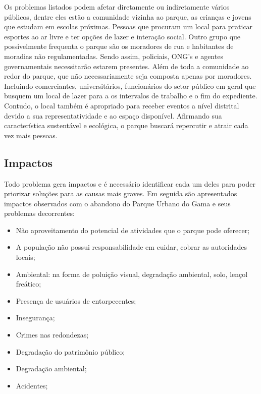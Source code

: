 	Os problemas listados podem afetar diretamente ou indiretamente v\'arios p\'ublicos, dentre eles est\~ao a comunidade vizinha ao parque, as crian\c{c}as e jovens que estudam em escolas pr\'oximas. Pessoas que procuram um local para praticar esportes ao ar livre e ter op\c{c}\~oes de lazer e intera\c{c}\~ao social.
	Outro grupo que possivelmente frequenta o parque s\~ao os moradores de rua e habitantes de moradias n\~ao regulamentadas. Sendo assim, policiais, ONG's e agentes governamentais necessitar\~ao estarem presentes.
	Al\'em de toda a comunidade ao redor do parque, que n\~ao necessariamente seja composta apenas por moradores. Incluindo comerciantes, universit\'arios, funcion\'arios do setor p\'ublico em geral que busquem um local de lazer para a os intervalos de trabalho e o fim do expediente.
	Contudo, o local tamb\'em \'e apropriado para receber eventos a n\'ivel distrital devido a sua representatividade e ao espa\c{c}o dispon\'ivel. Afirmando sua caracter\'istica sustent\'avel e ecol\'ogica, o parque buscar\'a repercutir e atrair cada vez mais pessoas.
	
\subsection{Impactos}

Todo problema gera impactos e \'e necess\'ario identificar cada um deles para poder priorizar solu\c{c}\~oes para as causas mais graves. Em seguida s\~ao apresentados impactos observados com o abandono do Parque Urbano do Gama e seus problemas decorrentes:

\begin{itemize}
	\item N\~ao aproveitamento do potencial de atividades que o parque pode oferecer;
	\item A popula\c{c}\~ao n\~ao possui responsabilidade em cuidar, cobrar as autoridades locais;
	\item Ambiental: na forma de polui\c{c}\~ao visual, degrada\c{c}\~ao ambiental, solo, len\c{c}ol fre\'atico;
	\item Presen\c{c}a de usu\'arios de entorpecentes;
	\item Inseguran\c{c}a;
	\item Crimes nas redondezas;
	\item Degrada\c{c}\~ao do patrim\^onio p\'ublico;
	\item Degrada\c{c}\~ao ambiental;
	\item Acidentes;
\end{itemize}

